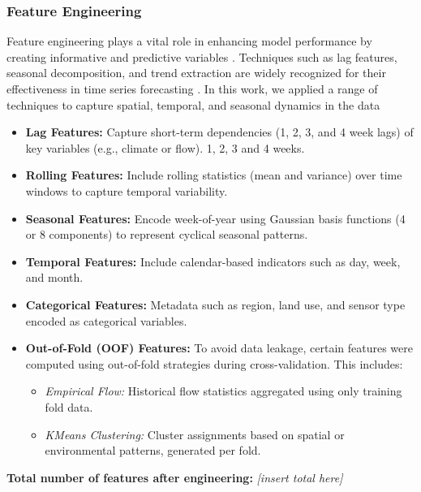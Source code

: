 \documentclass[ruler]{CUP-JNL-EDS}%
\begin{document}
\subsubsection{Feature Engineering}
Feature engineering plays a vital role in enhancing model performance by creating informative and predictive variables \citep{kuhnjohnson2019}. 
Techniques such as lag features, seasonal decomposition, and trend extraction are widely recognized for their effectiveness in time series 
forecasting \citep{kuhnjohnson2019, hyndman2018}. In this work, we applied a range of techniques to capture spatial, temporal, and seasonal dynamics in the data
\begin{itemize}    
    \item \textbf{Lag Features:} Capture short-term dependencies (1, 2, 3, and 4 week lags)  of key variables (e.g., climate or flow). 1, 2, 3 and 4 weeks.
    
    \item \textbf{Rolling Features:} Include rolling statistics (mean and variance) over time windows to capture temporal variability.
    
    \item \textbf{Seasonal Features:} Encode week-of-year using Gaussian basis functions (4 or 8 components) to represent cyclical seasonal patterns.
    
    \item \textbf{Temporal Features:} Include calendar-based indicators such as day, week, and month.
    
    \item \textbf{Categorical Features:} Metadata such as region, land use, and sensor type encoded as categorical variables.
    
    \item \textbf{Out-of-Fold (OOF) Features:} To avoid data leakage, certain features were computed using out-of-fold strategies during cross-validation. This includes:
    \begin{itemize}
        \item \textit{Empirical Flow:} Historical flow statistics aggregated using only training fold data.
        \item \textit{KMeans Clustering:} Cluster assignments based on spatial or environmental patterns, generated per fold.
    \end{itemize}
\end{itemize}

\noindent\textbf{Total number of features after engineering:} \textit{[insert total here]}
\end{document}
